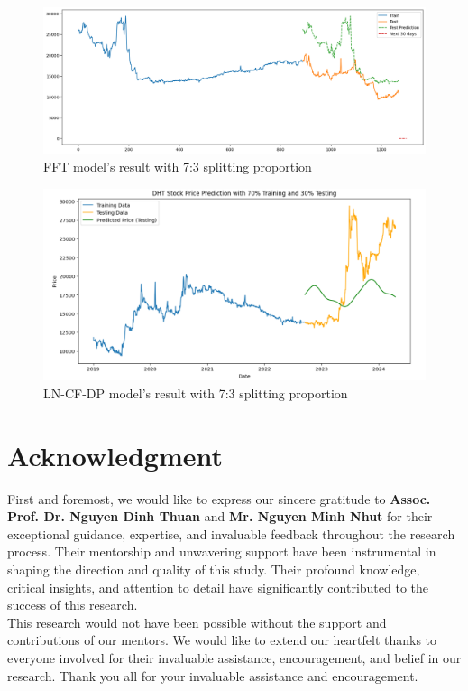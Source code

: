 \documentclass{ieeeojies}
\begin{document}
\begin{figure}[H]
  \centering
  \begin{minipage}{0.8\linewidth}
    \centering
    \includegraphics[width=\linewidth]{bibliography/Figure/DHT_FFT.png}
    \caption{FFT model's result with 7:3 splitting proportion}
    \label{fig8}
  \end{minipage}
\end{figure}

\begin{figure}[H]
  \centering
  \begin{minipage}{0.8\linewidth}
    \centering
    \includegraphics[width=\linewidth]{bibliography/Figure/DHT_LN_CF&DP.png}
    \caption{LN-CF-DP model's result with 7:3 splitting proportion}
    \label{fig8}
  \end{minipage}
\end{figure}

\section*{Acknowledgment}
First and foremost, we would like to express our sincere gratitude to \textbf{Assoc. Prof. Dr. Nguyen Dinh Thuan} and \textbf{Mr. Nguyen Minh Nhut} for their exceptional guidance, expertise, and invaluable feedback throughout the research process. Their mentorship and unwavering support have been instrumental in shaping the direction and quality of this study. Their profound knowledge, critical insights, and attention to detail have significantly contributed to the success of this research.
\\This research would not have been possible without the support and contributions of our mentors. We would like to extend our heartfelt thanks to everyone involved for their invaluable assistance, encouragement, and belief in our research. Thank you all for your invaluable assistance and encouragement.
\end{document}

